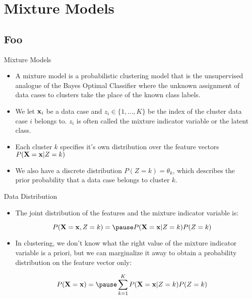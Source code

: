 \documentclass[serif,xcolor=pdftex,dvipsnames,table,hyperref={bookmarks=false,breaklinks}]{beamer}
\begin{document}
\maketitlepage

\section{Mixture Models}
\subsection{Foo}

\begin{frame}[t]{Mixture Models}

\begin{itemize}
\item A mixture model is a probabilistic clustering model that is the 
unsupervised analogue of the Bayes Optimal Classifier where the unknown 
assignment of data cases to clusters take the place of the known class labels. 

\pause\item We let ${\mathbf{x}}_i$ be a data case and $z_i\in\{1,...,K\}$ be the 
index of the cluster data case $i$ belongs to. $z_i$ is often called the 
mixture indicator variable or the latent class.

\pause\item Each cluster $k$ specifies it's own distribution over the feature 
vectors $P({\mathbf{X}}={\mathbf{x}}|Z=k)$ 

\pause\item We also have a discrete distribution $P(Z=k)=\theta_k$, which 
describes the prior probability that a data case belongs to cluster $k$.
\end{itemize}
\end{frame}

\begin{frame}[t]{Data Distribution}

\begin{itemize}
\item The joint  distribution of the features and the mixture indicator 
variable is:

$$P(\mbf{X}=\mbf{x},Z=k)=\pause P(\mbf{X}=\mbf{x}|Z=k)P(Z=k)$$

\pause\item In clustering, we don't know what the right value of the mixture 
indicator variable is a priori, but we can marginalize it away to obtain a 
probability distribution on the feature vector only:

$$P(\mbf{X}=\mbf{x})=\pause \sum_{k=1}^KP(\mbf{X}=\mbf{x}|Z=k)P(Z=k)$$

\end{itemize}
\end{frame}
\end{document}
